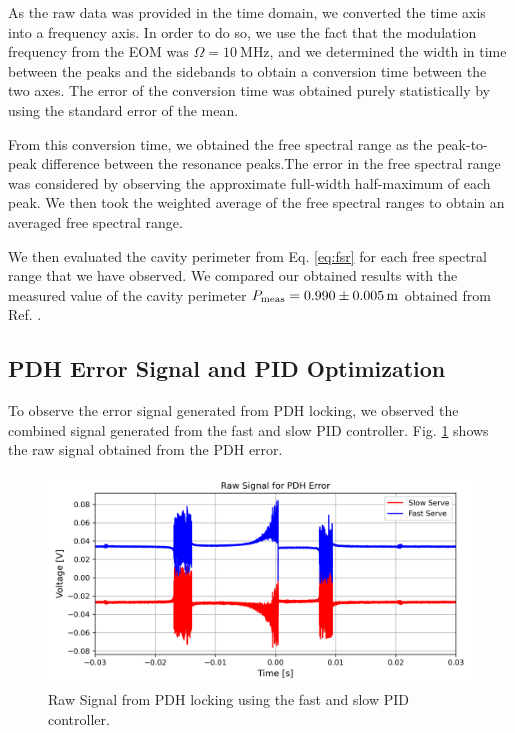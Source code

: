 \documentclass[a4paper]{report}
\numberwithin{equation}{section}
\begin{document}
As the raw data was provided in the time domain, we converted the time axis into a frequency axis.
In order to do so, we use the fact that the modulation frequency from the EOM was $\Omega = \SI{10}{\mega\hertz}$,
and we determined the width in time between the peaks and the sidebands to obtain a conversion time between 
the two axes. The error of the conversion time was obtained purely statistically by using the standard error of the mean. \par 

From this conversion time, we obtained the free spectral range as the peak-to-peak difference between
the resonance peaks.The error in the free spectral range was considered by observing the approximate 
full-width half-maximum of each peak. We then took the weighted average of the free spectral ranges to obtain an averaged
free spectral range. \par 

We then evaluated the cavity perimeter from Eq. \ref{eq:fsr} for each free spectral range that we have observed.
We compared our obtained results with the measured value of the cavity perimeter
 $P_{\text{meas}} = \SI{0.990\pm 0.005}{\meter}$ obtained from Ref. \cite{Groh2021}. 


\subsection{PDH Error Signal and PID Optimization} \label{sec:pdh_err_procedure}

To observe the error signal generated from PDH locking, we observed the combined signal generated from the fast and slow PID controller. 
Fig. \ref{fig:errsig_raw} shows the raw signal obtained from the PDH error. \par 

\begin{figure}[h!]
	\centering
	\includegraphics[width=0.8\columnwidth]{raw_err_sig.png}
	\caption{Raw Signal from PDH locking using the fast and slow PID controller.}
	\label{fig:errsig_raw}
\end{figure}
\end{document}
